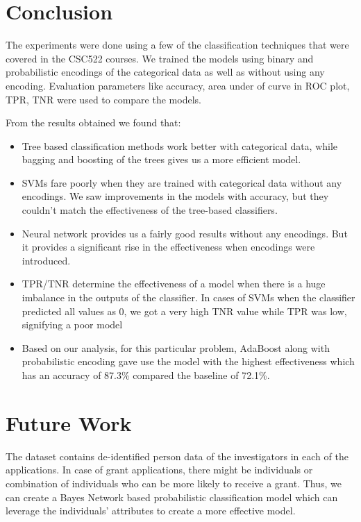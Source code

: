 \documentclass{article} %
\begin{document}
	\section{Conclusion}
	The experiments were done using a few of the classification techniques that were covered in the CSC522 courses. We trained the models using binary and probabilistic encodings of the categorical data as well as without using any encoding. Evaluation parameters like accuracy, area under of curve in ROC plot, TPR, TNR were used to compare the models.
	
	From the results obtained we found that:
	
	\begin{itemize}
		\item Tree based classification methods work better with categorical data, while bagging and boosting of the trees gives us a more efficient model.
		\item SVMs fare poorly when they are trained with categorical data without any encodings. We saw improvements in the models with accuracy, but they couldn't match the effectiveness of the tree-based classifiers.
		\item Neural network provides us a fairly good results without any encodings. But it provides a significant rise in the effectiveness when encodings were introduced.
		\item TPR/TNR determine the effectiveness of a model when there is a huge imbalance in the outputs of the classifier. In cases of SVMs when the classifier predicted all values as 0, we got a very high TNR value while TPR was low, signifying a poor model
		\item Based on our analysis, for this particular problem, AdaBoost along with probabilistic encoding gave use the model with the highest effectiveness which has an accuracy of 87.3\% compared the baseline of 72.1\%.
	\end{itemize}
	
	\section{Future Work}
	The dataset contains de-identified person data of the investigators in each of the applications. In case of grant applications, there might be individuals or combination of individuals who can be more likely to receive a grant. Thus,  we can create a Bayes Network based probabilistic classification model which can leverage the individuals' attributes to create a more effective model.  
	
\end{document}
